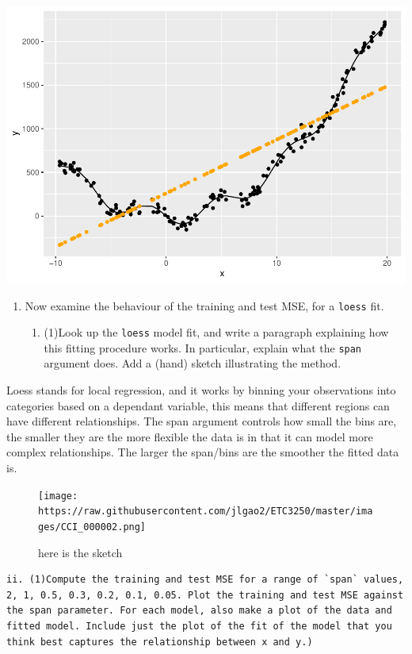 \documentclass[
]{article}
\providecommand{\tightlist}{%
  \setlength{\itemsep}{0pt}\setlength{\parskip}{0pt}}
\begin{document}
\includegraphics{assignment1_files/figure-latex/unnamed-chunk-3-1.pdf}

\begin{enumerate}
\def\labelenumi{\alph{enumi}.}
\setcounter{enumi}{2}
\tightlist
\item
  Now examine the behaviour of the training and test MSE, for a
  \texttt{loess} fit.

  \begin{enumerate}
  \def\labelenumii{\roman{enumii}.}
  \tightlist
  \item
    (1)Look up the \texttt{loess} model fit, and write a paragraph
    explaining how this fitting procedure works. In particular, explain
    what the \texttt{span} argument does. Add a (hand) sketch
    illustrating the method.
  \end{enumerate}
\end{enumerate}

Loess stands for local regression, and it works by binning your
observations into categories based on a dependant variable, this means
that different regions can have different relationships. The span
argument controls how small the bins are, the smaller they are the more
flexible the data is in that it can model more complex relationships.
The larger the span/bins are the smoother the fitted data is.

\begin{figure}
\centering
\texttt{[image: https://raw.githubusercontent.com/jlgao2/ETC3250/master/images/CCI\_000002.png]}
\caption{here is the sketch}
\end{figure}

\begin{verbatim}
ii. (1)Compute the training and test MSE for a range of `span` values, 2, 1, 0.5, 0.3, 0.2, 0.1, 0.05. Plot the training and test MSE against the span parameter. For each model, also make a plot of the data and fitted model. Include just the plot of the fit of the model that you think best captures the relationship between x and y.)
\end{verbatim}
\end{document}
